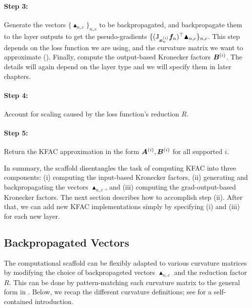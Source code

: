 \paragraph{Step 3:} Generate the vectors $\{\blacktriangle_{n,c}\}_{n,c}$ to be backpropagated, and backpropagate them to the layer outputs to get the pseudo-gradients $\{(\mathrm{J}_{{\bm{x}}_n^{(i)}} {\bm{f}}_n)^{\top} \blacktriangle_{n,c} \}_{n,c}$.
This step depends on the loss function we are using, and the curvature matrix we want to approximate ().
Finally, compute the output-based Kronecker factors ${\bm{B}}^{(i)}$.
The details will again depend on the layer type and we will specify them in later chapters.

\paragraph{Step 4:} Account for scaling caused by the loss function's reduction $R$.

\paragraph{Step 5:} Return the KFAC approximation in the form ${\bm{A}}^{(i)}, {\bm{B}}^{(i)}$ for all supported $i$.

In summary, the scaffold disentangles the task of computing KFAC into three components: (i) computing the input-based Kronecker factors, (ii) generating and backpropagating the vectors $\blacktriangle_{n,c}$, and (iii) computing the grad-output-based Kronecker factors.
The next section describes how to accomplish step (ii).
After that, we can add new KFAC implementations simply by specifying (i) and (iii) for each new layer.

\subsection{Backpropagated Vectors}\label{subsec:backpropagated-vectors}
The computational scaffold can be flexibly adapted to various curvature matrices by modifying the choice of backpropageted vectors $\blacktriangle_{n,c}$ and the reduction factor $R$.
This can be done by pattern-matching each curvature matrix to the general form in .
Below, we recap the different curvature definitions; see  for a self-contained introduction.

